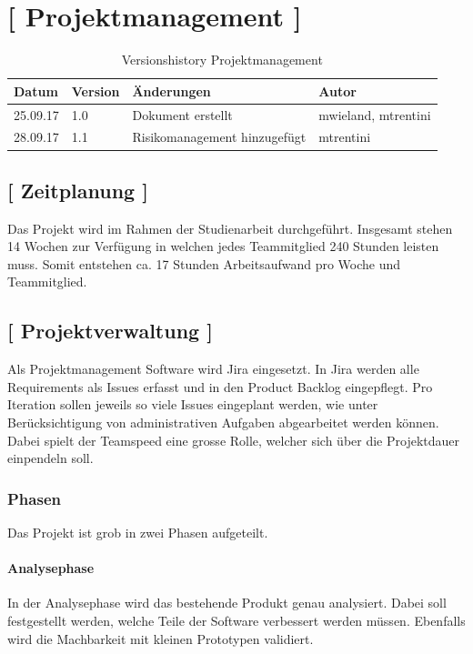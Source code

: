 \documentclass[11pt,a4paper,english,oneside]{book}
\numberwithin{equation}{chapter}
\begin{document}
	
	
	
	
	
	\chapter{ [ Projektmanagement ]}
	
	\begin{table}[h!]
		\centering
		\begin{tabularx}{\linewidth}{X X X X}
			\toprule 
			Datum & Version & Änderungen & Autor \\
			\midrule
			25.09.17 & 1.0 & Dokument erstellt & mwieland, mtrentini \\
			28.09.17 & 1.1 & Risikomanagement hinzugefügt & mtrentini \\
			\bottomrule 
		\end{tabularx} 
		\caption{Versionshistory Projektmanagement} 
	\end{table}
	
	\section{ [ Zeitplanung ] }
	
	Das Projekt wird im Rahmen der Studienarbeit durchgeführt. Insgesamt stehen 14 Wochen zur Verfügung in welchen jedes Teammitglied 240 Stunden leisten muss. Somit entstehen ca. 17 Stunden Arbeitsaufwand pro Woche und Teammitglied.
		
	\section{ [ Projektverwaltung ] }
	
	Als Projektmanagement Software wird Jira \cite{jira} eingesetzt. In Jira werden alle Requirements als Issues erfasst und in den Product Backlog eingepflegt. Pro Iteration sollen jeweils so viele Issues eingeplant werden, wie unter Berücksichtigung von administrativen Aufgaben abgearbeitet werden können. Dabei spielt der Teamspeed eine grosse Rolle, welcher sich über die Projektdauer einpendeln soll. 
	
	\subsection{Phasen}
	Das Projekt ist grob in zwei Phasen aufgeteilt.
	
	\subsubsection{Analysephase}
	In der Analysephase wird das bestehende Produkt genau analysiert. Dabei soll festgestellt werden, welche Teile der Software verbessert werden müssen. Ebenfalls wird die Machbarkeit mit kleinen Prototypen validiert. 
	
\end{document}

